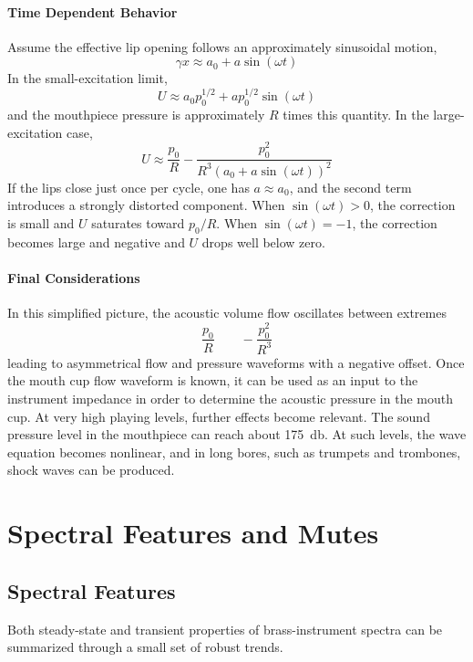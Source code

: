 \paragraph{Time Dependent Behavior} Assume the effective lip opening follows an approximately sinusoidal motion,
\[
\gamma x \approx a_{0} + a\sin(\omega t)
\]
In the small-excitation limit,
\[
U \approx a_{0}p_{0}^{1/2} + ap_{0}^{1/2}\sin(\omega t)
\]
and the mouthpiece pressure is approximately \( R \) times this quantity. In the large-excitation case,
\[
U \approx \frac{p_{0}}{R} - \frac{p_{0}^{2}}{R^{3}(a_{0} + a\sin(\omega t))^{2}}
\]
If the lips close just once per cycle, one has \( a \approx a_{0} \), and the second term introduces a strongly distorted component. When \( \sin(\omega t) > 0 \), the correction is small and \( U \) saturates toward \( p_{0}/R \). When \( \sin(\omega t) = -1 \), the correction becomes large and negative and \( U \) drops well below zero. 

\paragraph{Final Considerations} In this simplified picture, the acoustic volume flow oscillates between extremes
\[
\frac{p_{0}}{R}
\qquad
-\frac{p_{0}^{2}}{R^{3}}
\]
leading to asymmetrical flow and pressure waveforms with a negative offset. Once the mouth cup flow waveform is known, it can be used as an input to the instrument impedance in order to determine the acoustic pressure in the mouth cup. At very high playing levels, further effects become relevant. The sound pressure level in the mouthpiece can reach about \SI{175}{\decibel}. At such levels, the wave equation becomes nonlinear, and in long bores, such as trumpets and trombones, shock waves can be produced.

\section{Spectral Features and Mutes}

\subsection{Spectral Features}

Both steady-state and transient properties of brass-instrument spectra can be summarized through a small set of robust trends.

